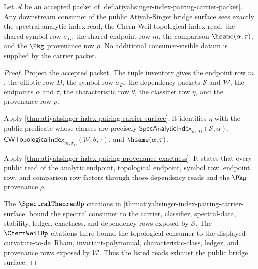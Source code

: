 \begin{theorem}
\label{thm:atiyahsinger-spectral-chernweil-consumer-exhaustion}
Let $\mathcal{A}$ be an accepted packet of
\autoref{def:atiyahsinger-index-pairing-carrier-packet}. Any downstream
consumer of the public Atiyah-Singer bridge surface sees exactly the spectral
analytic-index read, the Chern-Weil topological-index read, the shared symbol
row $\sigma_D$, the shared endpoint row $m$, the comparison
$\hsame(\alpha,\tau)$, and the $\Pkg$ provenance row $\rho$. No additional
consumer-visible datum is supplied by the carrier packet.
\end{theorem}
\begin{proof}
Project the accepted packet. The tuple inventory gives the endpoint row $m$,
the elliptic row $D$, the symbol row $\sigma_D$, the dependency packets
$\mathcal{S}$ and $\mathcal{W}$, the endpoints $\alpha$ and $\tau$, the
characteristic row $\theta$, the classifier row $\eta$, and the provenance row
$\rho$.

Apply \autoref{thm:atiyahsinger-index-pairing-carrier-surface}. It identifies
$\eta$ with the public predicate whose clauses are precisely
$\mathsf{SpecAnalyticIndex}_{m,D}(\mathcal{S},\alpha)$,
$\mathsf{CWTopologicalIndex}_{m,\sigma_D}(\mathcal{W},\theta,\tau)$, and
$\hsame(\alpha,\tau)$.

Apply \autoref{thm:atiyahsinger-index-pairing-provenance-exactness}. It
states that every public read of the analytic endpoint, topological endpoint,
symbol row, endpoint row, and comparison row factors through those dependency
reads and the $\Pkg$ provenance $\rho$.

The $\SpectralTheoremUp$ citations in
\autoref{thm:atiyahsinger-index-pairing-carrier-surface} bound the spectral
consumer to the carrier, classifier, spectral-data, stability, ledger,
exactness, and dependency rows exposed by $\mathcal{S}$. The $\ChernWeilUp$
citations there bound the topological consumer to the displayed
curvature-to-de~Rham, invariant-polynomial, characteristic-class, ledger, and
provenance rows exposed by $\mathcal{W}$. Thus the listed reads exhaust the
public bridge surface.
\end{proof}

